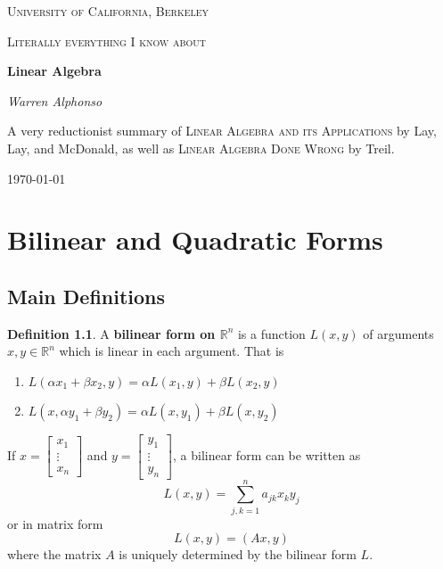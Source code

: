 \documentclass[a4paper,10pt]{book}
\newcommand{\R}{\mathbb{R}}
\theoremstyle{plain}
\theoremstyle{plain}
\theoremstyle{remark}
\theoremstyle{definition}
\newtheorem{definition}{Definition}[section]
\begin{document}
\frontmatter 
{\let\cleardoublepage\clearpage 
\begin{titlepage}
	\centering
	{\scshape\LARGE University of California, Berkeley \par}
	\vspace{3cm}
	{\scshape\Large Literally everything I know about \par}
	\vspace{1.5cm}
	{\huge\bfseries Linear Algebra\par}
	\vspace{2.5cm}
	{\Large\itshape Warren Alphonso\par}
	\vfill
	{\large A very reductionist summary of \textsc{Linear Algebra and its Applications} by Lay, Lay, and McDonald, as well as \textsc{Linear Algebra Done Wrong} by Treil. \par}
	\vfill
	{\large \today\par}
\end{titlepage}

\tableofcontents
}

\mainmatter

\chapter{Bilinear and Quadratic Forms}

\section{Main Definitions}

\begin{definition}
A \textbf{bilinear form on $\R^{n}$} is a function $L(x, y)$ of arguments $x, y \in \R^{n}$ which is linear in each argument. That is 
\begin{enumerate}
	\item $L(\alpha x_{1} + \beta x_{2}, y) = \alpha L(x_{1}, y) + \beta L(x_{2}, y)$
	\item $L(x, \alpha y_{1} + \beta y_{2}) = \alpha L(x, y_{1}) + \beta L(x, y_{2})$
\end{enumerate}

If $x = \begin{bmatrix}
x_{1} \\
\vdots \\
x_{n}
\end{bmatrix}$ and $y = \begin{bmatrix}
y_{1} \\
\vdots \\
y_{n}
\end{bmatrix}$, a bilinear form can be written as 
$$L(x, y) = \sum_{j, k = 1}^{n} a_{jk} x_{k} y_{j}$$
or in matrix form 
$$L(x, y) = (Ax, y)$$
where the matrix $A$ is uniquely determined by the bilinear form $L$.
\end{definition}
\end{document}
